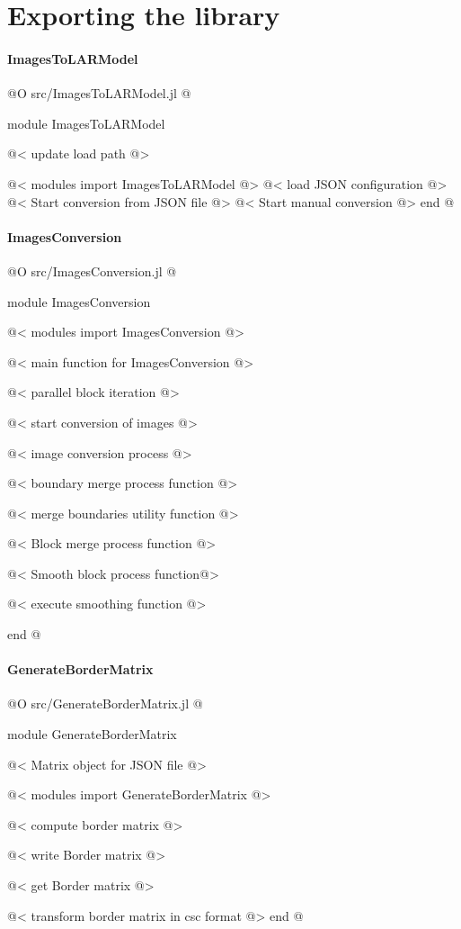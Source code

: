 \documentclass[11pt,oneside]{article}	%
\begin{document}
\section{Exporting the library}

\paragraph{ImagesToLARModel}
@O src/ImagesToLARModel.jl
@{module ImagesToLARModel

@< update load path @>

@< modules import ImagesToLARModel @>
@< load JSON configuration @>
@< Start conversion from JSON file @>
@< Start manual conversion @>
end
@}

\paragraph{ImagesConversion}
@O src/ImagesConversion.jl
@{module ImagesConversion

@< modules import ImagesConversion @>

@< main function for ImagesConversion @>

@< parallel block iteration @>

@< start conversion of images @>

@< image conversion process @>

@< boundary merge process function @>

@< merge boundaries utility function @>

@< Block merge process function @>

@< Smooth block process function@>

@< execute smoothing function @>

end
@}

\paragraph{GenerateBorderMatrix}

@O src/GenerateBorderMatrix.jl
@{module GenerateBorderMatrix

@< Matrix object for JSON file @>

@< modules import GenerateBorderMatrix @>

@< compute border matrix @>

@< write Border matrix  @>

@< get Border matrix @>

@< transform border matrix in csc format @>
end
@}
\end{document}
